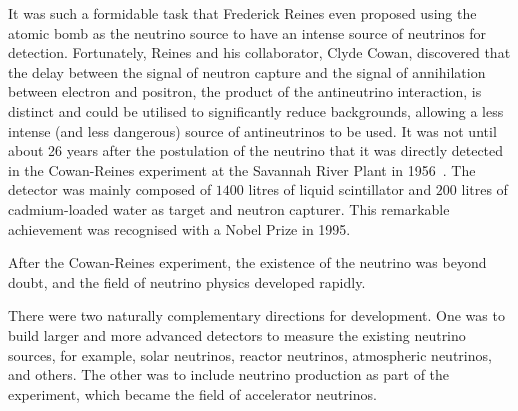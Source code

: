 It was such a formidable task that Frederick Reines even proposed using the atomic bomb as the neutrino source to have an intense source of neutrinos for detection.
Fortunately, Reines and his collaborator, Clyde Cowan, discovered that the delay between the signal of neutron capture and the signal of annihilation between electron and positron, the product of the antineutrino interaction, is distinct and could be utilised to significantly reduce backgrounds, allowing a less intense (and less dangerous) source of antineutrinos to be used.
It was not until about 26 years after the postulation of the neutrino that it was directly detected in the Cowan-Reines experiment at the Savannah River Plant in 1956~\cite{Cowan:1956rrn}. 
The detector was mainly composed of $1400$ litres of liquid scintillator and $200$ litres of cadmium-loaded water as target and neutron capturer.
This remarkable achievement was recognised with a Nobel Prize in 1995.

After the Cowan-Reines experiment, the existence of the neutrino was beyond doubt, and the field of neutrino physics developed rapidly. 

There were two naturally complementary directions for development.
One was to build larger and more advanced detectors to measure the existing neutrino sources, for example, solar neutrinos, reactor neutrinos, atmospheric neutrinos, and others.
The other was to include neutrino production as part of the experiment, which became the field of accelerator neutrinos.

